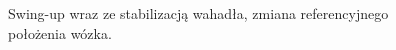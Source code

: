 \begin{figure}[H]
	\caption{Swing-up wraz ze stabilizacją wahadła, zmiana referencyjnego położenia wózka.}
\label{fig:Swing1}
\end{figure}
